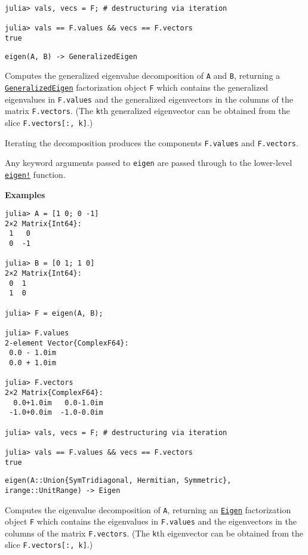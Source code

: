 \begin{adjustwidth}{2em}{0pt}
\begin{verbatim}
julia> vals, vecs = F; # destructuring via iteration

julia> vals == F.values && vecs == F.vectors
true
\end{verbatim}




\begin{lstlisting}
eigen(A, B) -> GeneralizedEigen
\end{lstlisting}

Computes the generalized eigenvalue decomposition of \texttt{A} and \texttt{B}, returning a \hyperlink{6969744257762628976}{\texttt{GeneralizedEigen}} factorization object \texttt{F} which contains the generalized eigenvalues in \texttt{F.values} and the generalized eigenvectors in the columns of the matrix \texttt{F.vectors}. (The \texttt{k}th generalized eigenvector can be obtained from the slice \texttt{F.vectors[:, k]}.)

Iterating the decomposition produces the components \texttt{F.values} and \texttt{F.vectors}.

Any keyword arguments passed to \texttt{eigen} are passed through to the lower-level \hyperlink{11207008815152064958}{\texttt{eigen!}} function.

\textbf{Examples}


\begin{verbatim}
julia> A = [1 0; 0 -1]
2×2 Matrix{Int64}:
 1   0
 0  -1

julia> B = [0 1; 1 0]
2×2 Matrix{Int64}:
 0  1
 1  0

julia> F = eigen(A, B);

julia> F.values
2-element Vector{ComplexF64}:
 0.0 - 1.0im
 0.0 + 1.0im

julia> F.vectors
2×2 Matrix{ComplexF64}:
  0.0+1.0im   0.0-1.0im
 -1.0+0.0im  -1.0-0.0im

julia> vals, vecs = F; # destructuring via iteration

julia> vals == F.values && vecs == F.vectors
true
\end{verbatim}




\begin{lstlisting}
eigen(A::Union{SymTridiagonal, Hermitian, Symmetric}, irange::UnitRange) -> Eigen
\end{lstlisting}

Computes the eigenvalue decomposition of \texttt{A}, returning an \hyperlink{2476442734611677039}{\texttt{Eigen}} factorization object \texttt{F} which contains the eigenvalues in \texttt{F.values} and the eigenvectors in the columns of the matrix \texttt{F.vectors}. (The \texttt{k}th eigenvector can be obtained from the slice \texttt{F.vectors[:, k]}.)


\end{adjustwidth}
